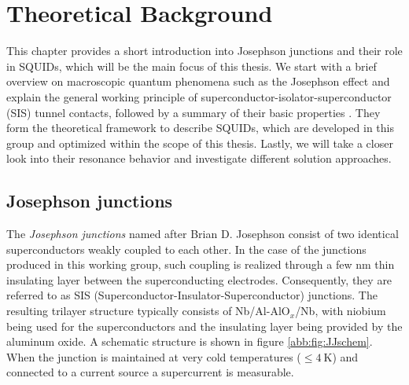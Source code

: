 \chapter{Theoretical Background}

This chapter provides a short introduction into Josephson junctions and their role in SQUIDs, which will be the main focus of this thesis. We start with a brief overview on macroscopic quantum phenomena such as the Josephson effect and explain the general working principle of superconductor-isolator-superconductor (SIS) tunnel contacts, followed by a summary of their basic properties . They form the theoretical framework to describe SQUIDs, which are developed in this group and optimized within the scope of this thesis. Lastly, we will take a closer look into their resonance behavior and investigate different solution approaches. 

\section{Josephson junctions}

The \textit{Josephson junctions} named after Brian D. Josephson consist of two identical superconductors weakly coupled to each other. In the case of the junctions produced in this working group, such coupling is realized through a few nm thin insulating layer between the superconducting electrodes. Consequently, they are referred to as SIS (Superconductor-Insulator-Superconductor) junctions. The resulting trilayer structure typically consists of Nb/Al-Al$\mathrm{O}_x$/Nb, with niobium being used for the superconductors and the insulating layer being provided by the aluminum oxide. A schematic structure is shown in figure \ref{abb:fig:JJschem}. When the junction is maintained at very cold temperatures ($\leq \qty{4}{\kelvin}$) and connected to a current source a supercurrent is measurable.

